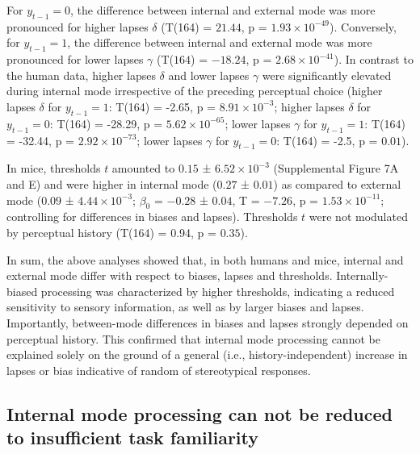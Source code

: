 \documentclass[
]{article}
\begin{document}
For \(y_{t-1} = 0\), the difference between internal and external mode
was more pronounced for higher lapses \(\delta\) (T(164) = \(21.44\), p
= \(\ensuremath{1.93\times 10^{-49}}\)). Conversely, for
\(y_{t-1} = 1\), the difference between internal and external mode was
more pronounced for lower lapses \(\gamma\) (T(\(164\)) = \(-18.24\), p
= \(\ensuremath{2.68\times 10^{-41}}\)). In contrast to the human data,
higher lapses \(\delta\) and lower lapses \(\gamma\) were significantly
elevated during internal mode irrespective of the preceding perceptual
choice (higher lapses \(\delta\) for \(y_{t-1} = 1\): T(164) = -2.65, p
= \(\ensuremath{8.91\times 10^{-3}}\); higher lapses \(\delta\) for
\(y_{t-1} = 0\): T(164) = -28.29, p =
\(\ensuremath{5.62\times 10^{-65}}\); lower lapses \(\gamma\) for
\(y_{t-1} = 1\): T(164) = -32.44, p =
\(\ensuremath{2.92\times 10^{-73}}\); lower lapses \(\gamma\) for
\(y_{t-1} = 0\): T(164) = -2.5, p = \(0.01\)).

In mice, thresholds \(t\) amounted to \(0.15\) ±
\(\ensuremath{6.52\times 10^{-3}}\) (Supplemental Figure 7A and E) and
were higher in internal mode (\(0.27\) ± \(0.01\)) as compared to
external mode (\(0.09\) ± \(\ensuremath{4.44\times 10^{-3}}\);
\(\beta_0\) = \(-0.28\) ± \(0.04\), T = \(-7.26\), p =
\(\ensuremath{1.53\times 10^{-11}}\); controlling for differences in
biases and lapses). Thresholds \(t\) were not modulated by perceptual
history (T(164) = 0.94, p = \(0.35\)).

In sum, the above analyses showed that, in both humans and mice,
internal and external mode differ with respect to biases, lapses and
thresholds. Internally-biased processing was characterized by higher
thresholds, indicating a reduced sensitivity to sensory information, as
well as by larger biases and lapses. Importantly, between-mode
differences in biases and lapses strongly depended on perceptual
history. This confirmed that internal mode processing cannot be
explained solely on the ground of a general (i.e., history-independent)
increase in lapses or bias indicative of random of stereotypical
responses.

\hypertarget{internal-mode-processing-can-not-be-reduced-to-insufficient-task-familiarity}{%
\subsection{Internal mode processing can not be reduced to insufficient
task
familiarity}\label{internal-mode-processing-can-not-be-reduced-to-insufficient-task-familiarity}}
\end{document}
